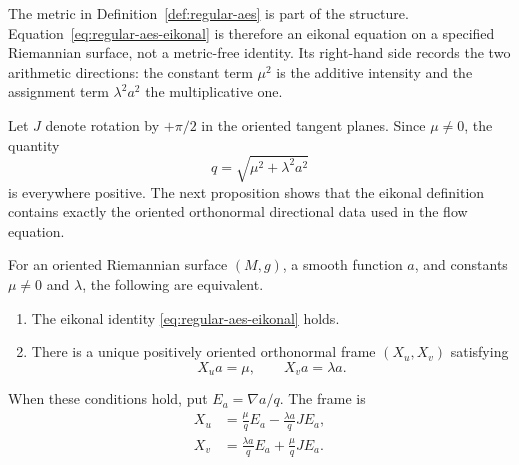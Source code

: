 The metric in Definition~\ref{def:regular-aes} is part of the structure.
Equation~\eqref{eq:regular-aes-eikonal} is therefore an eikonal equation on a
specified Riemannian surface, not a metric-free identity.  Its right-hand side
records the two arithmetic directions: the constant term $\mu^2$ is the
additive intensity and the assignment term $\lambda^2a^2$ the multiplicative
one.

Let $J$ denote rotation by $+\pi/2$ in the oriented tangent planes.  Since
$\mu\ne0$, the quantity
\[
 q=\sqrt{\mu^2+\lambda^2a^2}
\]
is everywhere positive.  The next proposition shows that the eikonal definition
contains exactly the oriented orthonormal directional data used in the flow
equation.

\begin{proposition}\label{prop:canonical-arithmetic-frame}
For an oriented Riemannian surface $(M,g)$, a smooth function $a$, and
constants $\mu\ne0$ and $\lambda$, the following are equivalent.
\begin{enumerate}
\item The eikonal identity \eqref{eq:regular-aes-eikonal} holds.
\item There is a unique positively oriented orthonormal frame
      $(X_u,X_v)$ satisfying
      \begin{equation}\label{eq:arithmetic-frame-derivatives}
       X_u a=\mu,
       \qquad
       X_v a=\lambda a.
      \end{equation}
\end{enumerate}
When these conditions hold, put $E_a=\nabla a/q$.  The frame is
\begin{equation}\label{eq:explicit-arithmetic-frame}
 \boxed{
 \begin{aligned}
 X_u&=\frac{\mu}{q}E_a-\frac{\lambda a}{q}J E_a,\\
 X_v&=\frac{\lambda a}{q}E_a+\frac{\mu}{q}J E_a.
 \end{aligned}}
\end{equation}
\end{proposition}

